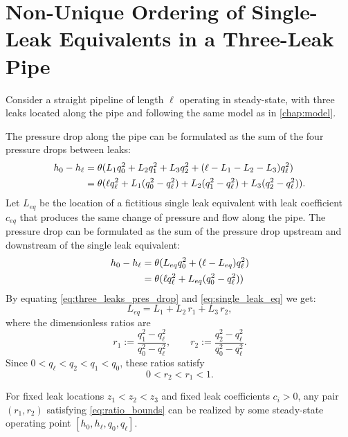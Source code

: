 \chapter{Non-Unique Ordering of Single-Leak Equivalents in a Three-Leak Pipe}
\label{app:3_leak_eq_proof}


Consider a straight pipeline of length $\ell$ operating in steady-state, with three leaks located along the pipe and following the same model as in \autoref{chap:model}.

The pressure drop along the pipe can be formulated as the sum of the four pressure drops between leaks:
\begin{align}
h_0-h_{\ell} &= \theta(L_1q_0^2+L_2q_1^2+L_3q_2^2 + (\ell-L_1-L_2-L_3)q_{\ell}^2) \notag \\
    &= \theta(\ell q_{\ell}^2 + L_1(q_0^2-q_{\ell}^2)+ L_2(q_1^2-q_{\ell}^2)+ L_3(q_2^2-q_{\ell}^2)) \label{eq:three_leaks_pres_drop}.
\end{align}
Let $L_{eq}$ be the location of a fictitious single leak equivalent with leak coefficient $c_{eq}$ that produces the same change of pressure and flow along the pipe. The pressure drop can be formulated as the sum of the pressure drop upstream and downstream of the single leak equivalent:
\begin{align}
h_0-h_{\ell} &= \theta(L_{eq}q_0^2+(\ell-L_{eq})q_{\ell}^2) \notag \\
    &= \theta(\ell q_{\ell}^2+L_{eq}(q_0^2-q_{\ell}^2)) \label{eq:single_leak_eq}
\end{align}
By equating \cref{eq:three_leaks_pres_drop} and \cref{eq:single_leak_eq} we get:
\begin{equation}\label{eq:Lf_general}
L_{eq}
=
L_1
+ L_2\,r_1
+ L_3\,r_2,
\end{equation}
where the dimensionless ratios are
\begin{equation}\label{eq:ratios_def}
r_1 := \frac{q_1^2-q_{\ell}^2}{q_0^2-q_{\ell}^2},
\qquad
r_2 := \frac{q_2^2-q_{\ell}^2}{q_0^2-q_{\ell}^2}.
\end{equation}
Since $0<q_{\ell}<q_2<q_1<q_0$, these ratios satisfy
\begin{equation}\label{eq:ratio_bounds}
0< r_2 < r_1 < 1.
\end{equation}

For fixed leak locations $z_1<z_2<z_3$ and fixed leak coefficients $c_i>0$, any pair $(r_1,r_2)$ satisfying \cref{eq:ratio_bounds} can be realized by some steady-state operating point $[h_0,h_{\ell},q_0,q_{\ell}]$.\\

